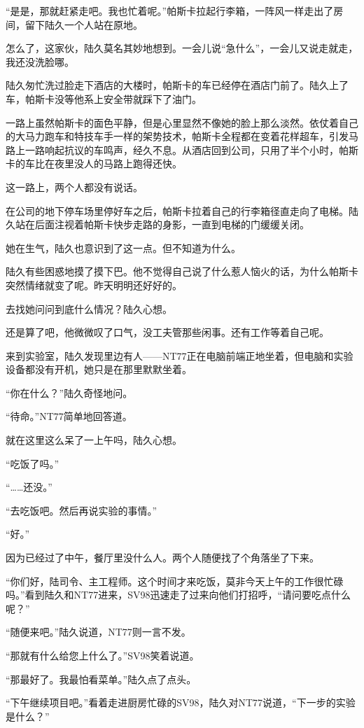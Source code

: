 “是是，那就赶紧走吧。我也忙着呢。”帕斯卡拉起行李箱，一阵风一样走出了房间，留下陆久一个人站在原地。

怎么了，这家伙，陆久莫名其妙地想到。一会儿说“急什么”，一会儿又说走就走，我还没洗脸哪。

陆久匆忙洗过脸走下酒店的大楼时，帕斯卡的车已经停在酒店门前了。陆久上了车，帕斯卡没等他系上安全带就踩下了油门。

一路上虽然帕斯卡的面色平静，但是心里显然不像她的脸上那么淡然。依仗着自己的大马力跑车和特技车手一样的架势技术，帕斯卡全程都在变着花样超车，引发马路上一路响起抗议的车鸣声，经久不息。从酒店回到公司，只用了半个小时，帕斯卡的车比在夜里没人的马路上跑得还快。

这一路上，两个人都没有说话。

在公司的地下停车场里停好车之后，帕斯卡拉着自己的行李箱径直走向了电梯。陆久站在后面注视着帕斯卡快步走路的身影，一直到电梯的门缓缓关闭。

她在生气，陆久也意识到了这一点。但不知道为什么。

陆久有些困惑地摸了摸下巴。他不觉得自己说了什么惹人恼火的话，为什么帕斯卡突然情绪就变了呢。昨天明明还好好的。

去找她问问到底什么情况？陆久心想。

还是算了吧，他微微叹了口气，没工夫管那些闲事。还有工作等着自己呢。

来到实验室，陆久发现里边有人——NT77正在电脑前端正地坐着，但电脑和实验设备都没有开机，她只是在那里默默坐着。

“你在什么？”陆久奇怪地问。

“待命。”NT77简单地回答道。

就在这里这么呆了一上午吗，陆久心想。

“吃饭了吗。”

“……还没。”

“去吃饭吧。然后再说实验的事情。”

“好。”

因为已经过了中午，餐厅里没什么人。两个人随便找了个角落坐了下来。

“你们好，陆司令、主工程师。这个时间才来吃饭，莫非今天上午的工作很忙碌吗。”看到陆久和NT77进来，SV98迅速走了过来向他们打招呼，“请问要吃点什么呢？”

“随便来吧。”陆久说道，NT77则一言不发。

“那就有什么给您上什么了。”SV98笑着说道。

“那最好了。我最怕看菜单。”陆久点了点头。

“下午继续项目吧。”看着走进厨房忙碌的SV98，陆久对NT77说道，“下一步的实验是什么？”

